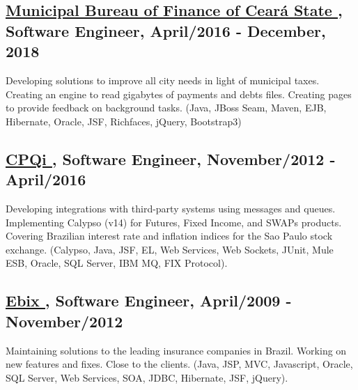 \documentclass[10pt,a4paper]{article}
\begin{document}
\subsection*{\href{https://www.sefin.fortaleza.ce.gov.br/}{\uline{Municipal Bureau of Finance of Ceará State \faExternalLink}}, Software Engineer, April/2016 - December, 2018}

Developing solutions to improve all city needs in light of municipal taxes. Creating an engine to read gigabytes of payments and debts files. Creating pages to provide feedback on background tasks. (Java, JBoss Seam, Maven, EJB, Hibernate, Oracle, JSF, Richfaces, jQuery, Bootstrap3)

\subsection*{\href{https://cpqi.com/}{\uline{CPQi \faExternalLink}}, Software Engineer, November/2012 - April/2016}

Developing integrations with third-party systems using messages and queues. Implementing Calypso (v14) for Futures, Fixed Income, and SWAPs products. Covering Brazilian interest rate and inflation indices for the Sao Paulo stock exchange. (Calypso, Java, JSF, EL, Web Services, Web Sockets, JUnit, Mule ESB, Oracle, SQL Server, IBM MQ, FIX Protocol).

\subsection*{\href{https://www.ebix.com/}{\uline{Ebix \faExternalLink}}, Software Engineer, April/2009 - November/2012}

Maintaining solutions to the leading insurance companies in Brazil. Working on new features and fixes. Close to the clients. (Java, JSP, MVC, Javascript, Oracle, SQL Server, Web Services, SOA, JDBC, Hibernate, JSF, jQuery).

\vspace{2em}
\end{document}
